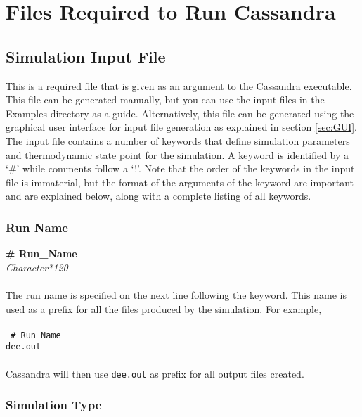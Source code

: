 \chapter{Files Required to Run Cassandra}
\label{ch:input_files}

\section{Simulation Input File} \label{sec:Input_File}
This is a required file that is given as an argument to the Cassandra
executable. This file can be generated manually, but you can use the input files in the Examples 
directory as a guide. Alternatively, this file can be generated using the graphical user interface 
for input file generation as explained in section \ref{sec:GUI}.
The input file contains a number of keywords that define simulation parameters
and thermodynamic state point for the simulation. A keyword is identified
by a `\#' while comments follow a `!'. Note that the order of the keywords in the input
file is immaterial, but the format of the arguments of the keyword are
important and are explained below, along with a complete listing of
all keywords. 
%
%
%
\subsection{Run Name}\label{sec:Run_Name}
{\bf \# Run\_Name}\\
{\it Character*120} \\ \\
%
The run name is specified on the next line following the keyword. This name is used as a prefix for all the files
produced by the simulation. For example,\\ \\
%
{\tt{
\# Run\_Name \\
dee.out
}} \\ \\
%
Cassandra will then use \texttt{dee.out} as prefix for all output files created.

%
%
%
\subsection{Simulation Type}\label{sec:Sim_Type}

